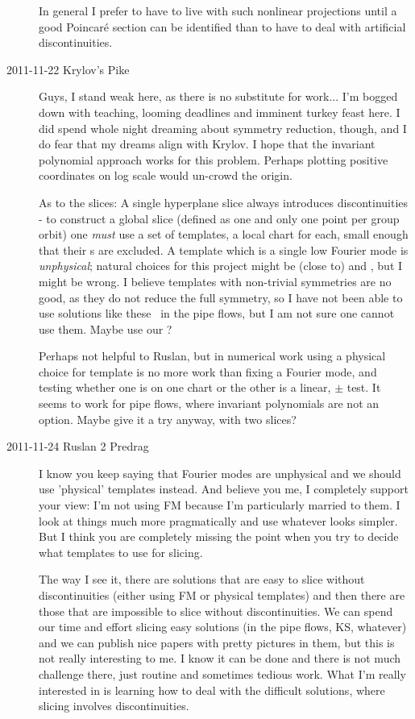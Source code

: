 \begin{description}
In general I prefer to have to live with such nonlinear projections until
a good Poincar\'e section can be identified than to have to deal with
artificial discontinuities.

\item[2011-11-22 Krylov's Pike] Guys, I stand weak here, as
there is no substitute for work... I'm bogged down with teaching, looming
deadlines and imminent turkey feast here. I did spend whole night
dreaming about symmetry reduction, though, and I do fear that my dreams
align with Krylov. I hope that the invariant polynomial approach works
for this problem. Perhaps plotting positive coordinates on log scale
would un-crowd the origin.

As to the slices: A single hyperplane slice always
introduces discontinuities - to construct a global slice (defined as one
and only one point per group orbit) one \emph{must} use a set of
templates, a local chart for each, small enough that their \sset s are
excluded. A template which is a single low Fourier mode is
\emph{unphysical}; natural choices for this project might be (close to)
 and , but I might be wrong. I believe templates with
non-trivial symmetries are no good, as they do not reduce the full
symmetry, so I have not been able to use solutions like these \eqva\ in
the pipe flows, but I am not sure one cannot use them. Maybe use our
?

Perhaps not helpful to Ruslan, but in numerical work using a physical
choice for template is no more work than fixing a Fourier mode, and
testing whether one is on one chart or the other is a linear, $\pm$ test.
It seems to work for pipe flows, where invariant polynomials are not an
option. Maybe give it a try anyway, with two slices?

\item[2011-11-24 Ruslan 2 Predrag] I know you keep saying that Fourier modes are unphysical and we should use 'physical' templates instead.  And believe you me, I completely support your view: I'm not using FM because I'm particularly married to them.  I look at things much more pragmatically and use whatever looks simpler.  But I think you are completely missing the point when you try to decide what templates to use for slicing.

    The way I see it, there are solutions that are easy to slice without discontinuities (either using FM or physical templates) and then there are those that are impossible to slice without discontinuities.  We can spend our time and effort slicing easy solutions (in the pipe flows, KS, whatever) and we can publish nice papers with pretty pictures in them, but this is not really interesting to me.  I know it can be done and there is not much challenge there, just routine and sometimes tedious work.  What I'm really interested in is learning how to deal with the difficult solutions, where slicing involves discontinuities.


\end{description}
